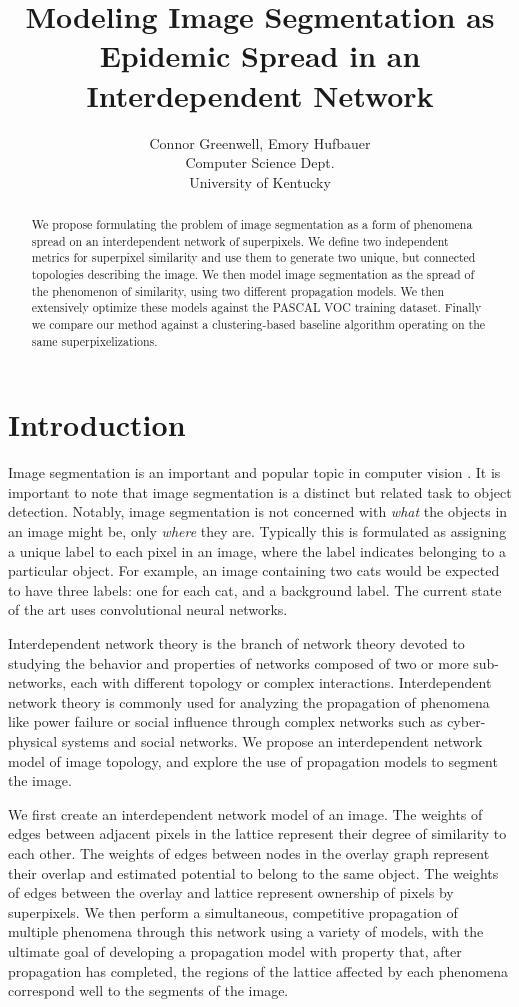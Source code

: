 \documentclass[twocolumn]{article}
\title{Modeling Image Segmentation as Epidemic Spread in an Interdependent Network}
\author{
  Connor Greenwell, Emory Hufbauer\\
  Computer Science Dept. \\
  University of Kentucky
}
\date{}
\begin{document}
\maketitle

\begin{abstract}
We propose formulating the problem of image segmentation as a form of phenomena spread on an interdependent network of superpixels. We define two independent metrics for superpixel similarity and use them to generate two unique, but connected topologies describing the image. We then model image segmentation as the spread of the phenomenon of similarity, using two different propagation models. We then extensively optimize these models against the PASCAL VOC training dataset. Finally we compare our method against a clustering-based baseline algorithm operating on the same superpixelizations.
\end{abstract}

\section{Introduction}

Image segmentation is an important and popular topic in computer vision
\cite{newell2017associative, li2017fully, ren2017end}. It is important to note
that image segmentation is a distinct but related task to object detection.
Notably, image segmentation is not concerned with \emph{what} the objects in an
image might be, only \emph{where} they are. Typically this is formulated as
assigning a unique label to each pixel in an image, where the label indicates
belonging to a particular object. For example, an image containing two cats
would be expected to have three labels: one for each cat, and a background
label. The current state of the art uses convolutional neural networks.

Interdependent network theory is the branch of network theory devoted to
studying the behavior and properties of networks composed of two or more
sub-networks, each with different topology or complex interactions.
Interdependent network theory is commonly used for analyzing the propagation of
phenomena like power failure or social influence through complex networks such
as cyber-physical systems and social networks. We propose an interdependent
network model of image topology, and explore the use of propagation models to
segment the image. 

We first create an interdependent network model of an image. The
weights of edges between adjacent pixels in the lattice represent
their degree of similarity to each other. The weights of edges between
nodes in the overlay graph represent their overlap and estimated
potential to belong to the same object. The weights of edges between the
overlay and lattice represent ownership of pixels by superpixels.
We then perform a simultaneous, competitive propagation of multiple
phenomena through this network using a variety of models, with the
ultimate goal of developing a propagation model with property that,
after propagation has completed, the regions of the lattice affected by
each phenomena correspond well to the segments of the image.
\end{document}
